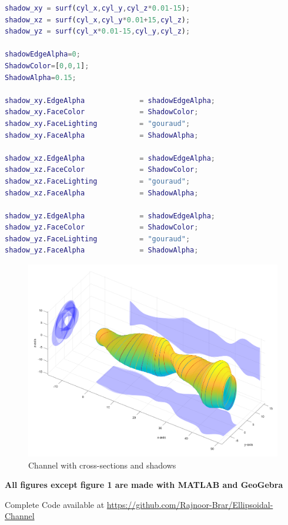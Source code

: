 \documentclass[a4paper]{article}
\begin{document}
\begin{lstlisting}[language=matlab]
shadow_xy = surf(cyl_x,cyl_y,cyl_z*0.01-15);
shadow_xz = surf(cyl_x,cyl_y*0.01+15,cyl_z);
shadow_yz = surf(cyl_x*0.01-15,cyl_y,cyl_z);

shadowEdgeAlpha=0;
ShadowColor=[0,0,1];
ShadowAlpha=0.15;

shadow_xy.EdgeAlpha             = shadowEdgeAlpha;
shadow_xy.FaceColor             = ShadowColor;
shadow_xy.FaceLighting          = "gouraud";
shadow_xy.FaceAlpha             = ShadowAlpha;

shadow_xz.EdgeAlpha             = shadowEdgeAlpha;
shadow_xz.FaceColor             = ShadowColor;
shadow_xz.FaceLighting          = "gouraud";
shadow_xz.FaceAlpha             = ShadowAlpha;

shadow_yz.EdgeAlpha             = shadowEdgeAlpha;
shadow_yz.FaceColor             = ShadowColor;
shadow_yz.FaceLighting          = "gouraud";
shadow_yz.FaceAlpha             = ShadowAlpha;
\end{lstlisting}
\newpage
\begin{figure}[h]
    \centering
    \includegraphics[width=1\linewidth]{Images/Shadowed_Tunnnel.png}
    \caption{Channel with cross-sections and shadows}
\end{figure}

\newpage



\textbf{All figures except figure 1 are made with MATLAB and GeoGebra}

Complete Code available at \url{https://github.com/Rajnoor-Brar/Ellipsoidal-Channel}
\end{document}
